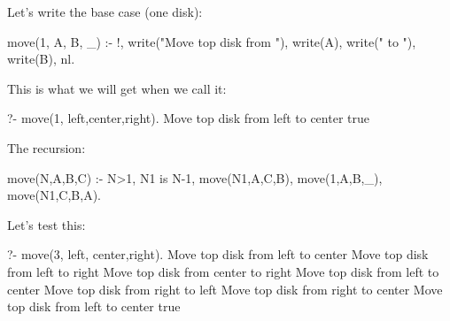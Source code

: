 Let's write the base case (one disk):

\begin{codeblock}
move(1, A, B, _) :- !,
    write("Move top disk from "),
    write(A), write(" to "), write(B), nl.
\end{codeblock}

This is what we will get when we call it:

\begin{codeblock}
?- move(1, left,center,right).
Move top disk from left to center
true
\end{codeblock}

The recursion:

\begin{codeblock}
move(N,A,B,C) :-
    N>1,
    N1 is N-1,
    move(N1,A,C,B),
    move(1,A,B,_),
    move(N1,C,B,A).
\end{codeblock}

Let's test this:
\begin{codeblock}
?- move(3, left, center,right).
Move top disk from left to center
Move top disk from left to right
Move top disk from center to right
Move top disk from left to center
Move top disk from right to left
Move top disk from right to center
Move top disk from left to center
true
\end{codeblock}


